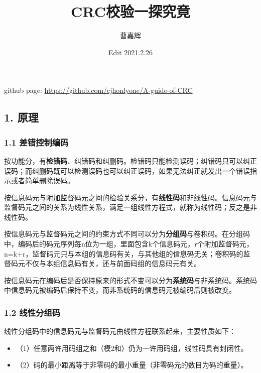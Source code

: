 \documentclass[
]{article}
\title{\huge \textbf{CRC校验一探究竟}}
\author{曹嘉辉}
\date{Edit 2021.2.26}
\begin{document}
\maketitle

github page: \url{https://github.com/cjhonlyone/A-guide-of-CRC}

\tableofcontents

\newpage
\hypertarget{header-n3}{%
\subsection{1. 原理}\label{header-n3}}

\hypertarget{header-n4}{%
\subsubsection{1.1 差错控制编码}\label{header-n4}}

按功能分，有\textbf{检错码}、纠错码和纠删码。检错码只能检测误码；纠错码只可以纠正误码；而纠删码既可以检测误码也可以纠正误码，如果无法纠正就发出一个错误指示或者简单删除误码。

按信息码元与附加监督码元之间的检验关系分，有\textbf{线性码}和非线性码。信息码元与监督码元之间的关系为线性关系，满足一组线性方程式，就称为线性码；反之是非线性码。

按信息码元与监督码元之间的约束方式不同可以分为\textbf{分组码}与卷积码。在分组码中，编码后的码元序列每n位为一组，里面包含k个信息码元，r个附加监督码元，n=k+r，监督码元只与本组的信息码有关，与其他组的信息码无关；卷积码的监督码元不仅与本组信息码有关，还与前面码组的信息码元有关。

按信息码元在编码后是否保持原来的形式不变可以分为\textbf{系统码}与非系统码。系统码中信息码元被编码后保持不变，而非系统码的信息码元被编码后则被改变。

\hypertarget{header-n9}{%
\subsubsection{1.2 线性分组码}\label{header-n9}}

线性分组码中的信息码元与监督码元由线性方程联系起来，主要性质如下：

\begin{itemize}
\item
  （1）任意两许用码组之和（模2和）仍为一许用码组，线性码具有封闭性。
\item
  （2）码的最小距离等于非零码的最小重量（非零码元的数目为码的重量）。
\end{itemize}
\end{document}

